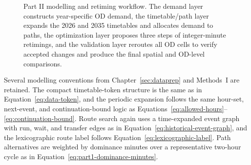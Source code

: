 \documentclass[preprint,12pt]{elsarticle}
\begin{document}
\begin{figure}[htbp]
{%
}
\caption[Part II modelling and retiming workflow]{Part II modelling and retiming workflow. The demand layer constructs year-specific OD demand, the timetable/path layer expands the 2026 and 2035 timetables and allocates demand to paths, the optimization layer proposes three steps of integer-minute retimings, and the validation layer reroutes all OD cells to verify accepted changes and produce the final spatial and OD-level comparisons.}


\label{fig:part2-workflow}
\end{figure}

Several modelling conventions from Chapter~\ref{sec:dataprep} and Methods~I are retained. The compact timetable-token structure is the same as in Equation~\eqref{eq:data-token}, and the periodic expansion follows the same hour-set, next-event, and continuation-bound logic as Equations~\eqref{eq:allowed-hours}--\eqref{eq:continuation-bound}. Route search again uses a time-expanded event graph with run, wait, and transfer edges as in Equation~\eqref{eq:historical-event-graph}, and the lexicographic route label follows Equation~\eqref{eq:lexicographic-label}. Path alternatives are weighted by dominance minutes over a representative two-hour cycle as in Equation~\eqref{eq:part1-dominance-minutes}.
\end{document}
